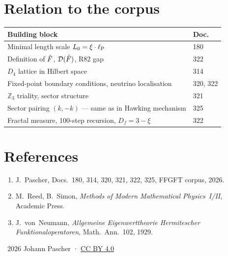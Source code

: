 \section*{Relation to the corpus}

\begin{center}
\begin{tabular}{@{}ll@{}}
  \toprule
  \textbf{Building block} & \textbf{Doc.} \\
  \midrule
  Minimal length scale $L_0 = \xi\cdot\ell_{\mathrm{P}}$ & 180 \\
  Definition of $\hat{F}$, $\mathcal{D}(\hat{F})$, R82 gap & 322 \\
  $D_4$ lattice in Hilbert space & 314 \\
  Fixed-point boundary conditions, neutrino localisation & 320, 322 \\
  $\mathbb{Z}_3$ triality, sector structure & 321 \\
  Sector pairing $(k,-k)$ — same as in Hawking mechanism & 325 \\
  Fractal measure, 100-step recursion, $D_f = 3-\xi$ & 322 \\
  \bottomrule
\end{tabular}
\end{center}

\section*{References}

\begin{enumerate}
  \item J.~Pascher, Docs.~180, 314, 320, 321, 322, 325, FFGFT corpus, 2026.
  \item M.~Reed, B.~Simon, \textit{Methods of Modern Mathematical Physics~I/II},
    Academic Press.
  \item J.~von~Neumann, \textit{Allgemeine Eigenwerttheorie Hermitescher
    Funktionaloperatoren}, Math.\ Ann.\ 102, 1929.
\end{enumerate}

\vspace{6pt}\noindent\small
\textcopyright\ 2026 Johann Pascher ·
\href{https://creativecommons.org/licenses/by/4.0/}{CC BY 4.0}
